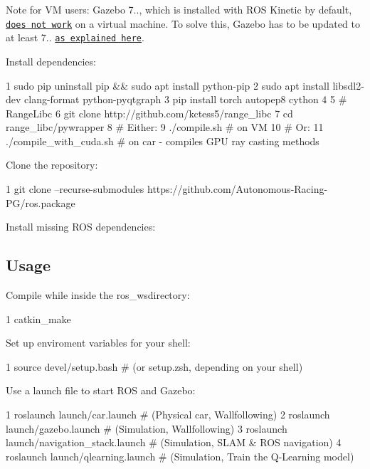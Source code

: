 Note for VM users\+: Gazebo 7.., which is installed with R\+OS Kinetic by default, \href{https://bitbucket.org/osrf/gazebo/issues/1837/vmware-rendering-z-ordering-appears-random}{\tt does not work} on a virtual machine. To solve this, Gazebo has to be updated to at least 7.. \href{http://gazebosim.org/tutorials?cat=install&tut=install_ubuntu&ver=7.0#Alternativeinstallation:step-by-step}{\tt as explained here}.

Install dependencies\+:


\begin{DoxyCode}
1 sudo pip uninstall pip && sudo apt install python-pip
2 sudo apt install libsdl2-dev clang-format python-pyqtgraph
3 pip install torch autopep8 cython
4 
5 # RangeLibc
6 git clone http://github.com/kctess5/range\_libc
7 cd range\_libc/pywrapper
8 # Either:
9 ./compile.sh            # on VM
10 # Or:
11 ./compile\_with\_cuda.sh  # on car - compiles GPU ray casting methods
\end{DoxyCode}


Clone the repository\+:


\begin{DoxyCode}
1 git clone --recurse-submodules https://github.com/Autonomous-Racing-PG/ros.package
\end{DoxyCode}


Install missing R\+OS dependencies\+:




\subsection*{Usage}

Compile while inside the {\ttfamily ros\+\_\+ws}directory\+:


\begin{DoxyCode}
1 catkin\_make
\end{DoxyCode}


Set up enviroment variables for your shell\+:


\begin{DoxyCode}
1 source devel/setup.bash # (or setup.zsh, depending on your shell)
\end{DoxyCode}


Use a launch file to start R\+OS and Gazebo\+:


\begin{DoxyCode}
1 roslaunch launch/car.launch # (Physical car, Wallfollowing)
2 roslaunch launch/gazebo.launch # (Simulation, Wallfollowing)
3 roslaunch launch/navigation\_stack.launch # (Simulation, SLAM & ROS navigation)
4 roslaunch launch/qlearning.launch # (Simulation, Train the Q-Learning model)
\end{DoxyCode}


